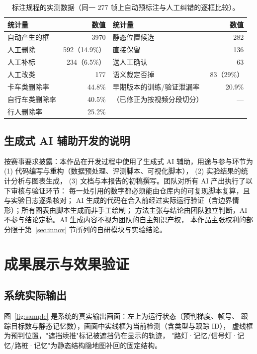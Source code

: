 \documentclass[11pt,a4paper]{ctexart}
\begin{document}
\begin{table}[t]\centering\small
\caption{标注规程的实测数据（同一 277 帧上自动预标注与人工纠错的逐框比较）。}
\label{tab:annot}
\begin{tabular}{lrlr}
\toprule
统计量 & 数值 & 统计量 & 数值 \\
\midrule
自动产生的框 & 3970 & 静态位置候选 & 282 \\
人工删除 & 592（14.9\%） & \quad 直接保留 & 136 \\
人工补标 & 234（6.5\%） & \quad 送人工确认 & 63 \\
人工改类 & 177 & \quad 语义裁定否掉 & 83（29\%） \\
\quad 卡车类删除率 & 44.8\% & 早期版本的训练/验证泄漏率 & 20.9\% \\
\quad 自行车类删除率 & 40.5\% & \quad（已修正为按视频分段切分） & — \\
\quad 行人删除率 & 25.2\% & & \\
\bottomrule
\end{tabular}
\end{table}

\subsection{生成式 AI 辅助开发的说明}

按赛事要求披露：本作品在开发过程中使用了生成式 AI 辅助，用途与参与环节为
(1) 代码编写与重构（数据预处理、评测脚本、可视化脚本），
(2) 实验结果的统计分析与图表生成，
(3) 文档与本报告的初稿撰写。团队对所有 AI 产出执行了以下审核与验证环节：
每一处引用的数字都必须能由仓库内的可复现脚本复算，且与实验日志逐条核对；
AI 生成的代码在合入前经过实际运行验证（含边界情形）；所有图表由脚本生成而非手工绘制；
方法主张与结论由团队独立判断，AI 不参与结论定稿。AI 生成内容不视为团队的自主知识产权，
本作品主张权利的部分限于第~\ref{sec:innov} 节所列的自研模块与实验结论。

\section{成果展示与效果验证}

\subsection{系统实际输出}

图~\ref{fig:sample} 是系统的真实输出画面：左上为运行状态（预判梯度、帧号、
跟踪目标数与静态记忆数），画面中实线框为当前检测（含类型与跟踪 ID），
虚线框为预判位置，"遮挡续推"标记被遮挡仍在显示的轨迹，
"路灯·记忆/信号灯·记忆/路桩·记忆"为静态结构隐地图补回的固定结构。
\end{document}
